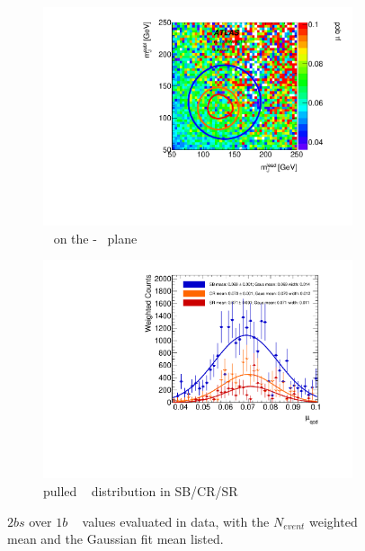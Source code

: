 \begin{figure}[htb!]
\centering
\captionsetup{justification=centering}
	\hspace{-1cm}
    \begin{subfigure}[b]{0.4\textwidth}
        \includegraphics[width=\textwidth,angle=-90]{figures/boosted/AppendixMuqcdstudy/TwoTag_split_Incl_mH0H1.pdf}
        \caption{\muqcd~ on the \mleadJ-\msublJ~ plane}
        \label{fig:app-muqcd-2bs-2d}
    \end{subfigure}
    \quad \quad \quad \quad 
    \begin{subfigure}[b]{0.4\textwidth}
        \includegraphics[width=\textwidth,angle=-90]{figures/boosted/AppendixMuqcdstudy/TwoTag_split_Incl_mH0H1_pull.pdf}
        \caption{pulled \muqcd~ distribution in SB/CR/SR}
        \label{fig:app-muqcd-2bs-pull}
    \end{subfigure}
\caption{$2bs$ over $1b$ \muqcd~ values evaluated in data, with the $N_{event}$ weighted mean and the Gaussian fit mean listed.}
\label{fig:app-muqcd-2bs}
\end{figure}

